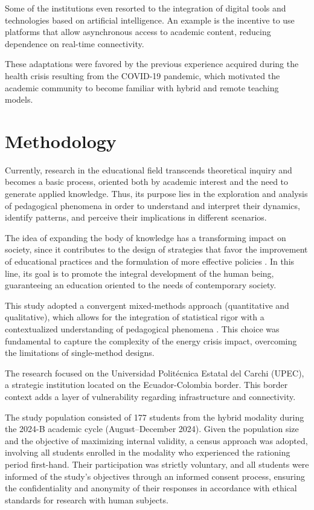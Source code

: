 \documentclass[english]{textolivre}
\begin{document}
Some of the institutions even resorted to the integration of digital tools and technologies based on artificial intelligence. An example is the incentive to use platforms that allow asynchronous access to academic content, reducing dependence on real-time connectivity.

These adaptations were favored by the previous experience acquired during the health crisis resulting from the COVID-19 pandemic, which motivated the academic community to become familiar with hybrid and remote teaching models.

\section{Methodology}\label{sec-conduta}
Currently, research in the educational field transcends theoretical inquiry and becomes a basic process, oriented both by academic interest and the need to generate applied knowledge. Thus, its purpose lies in the exploration and analysis of pedagogical phenomena in order to understand and interpret their dynamics, identify patterns, and perceive their implications in different scenarios.

The idea of expanding the body of knowledge has a transforming impact on society, since it contributes to the design of strategies that favor the improvement of educational practices and the formulation of more effective policies \cite{pereira2011metodos}. In this line, its goal is to promote the integral development of the human being, guaranteeing an education oriented to the needs of contemporary society.

This study adopted a convergent mixed-methods approach (quantitative and qualitative), which allows for the integration of statistical rigor with a contextualized understanding of pedagogical phenomena \cite{ramirezmontoya2020revision}. This choice was fundamental to capture the complexity of the energy crisis impact, overcoming the limitations of single-method designs.

The research focused on the Universidad Politécnica Estatal del Carchi (UPEC), a strategic institution located on the Ecuador-Colombia border. This border context adds a layer of vulnerability regarding infrastructure and connectivity.

The study population consisted of 177 students from the hybrid modality during the 2024-B academic cycle (August–December 2024). Given the population size and the objective of maximizing internal validity, a census approach was adopted, involving all students enrolled in the modality who experienced the rationing period first-hand. Their participation was strictly voluntary, and all students were informed of the study’s objectives through an informed consent process, ensuring the confidentiality and anonymity of their responses in accordance with ethical standards for research with human subjects.
\end{document}

